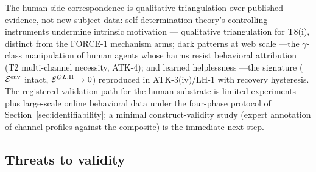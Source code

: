 The human-side correspondence is qualitative triangulation over published
evidence, not new subject data: self-determination theory's controlling
instruments undermine intrinsic motivation \citep{ryan_deci2000}---
qualitative triangulation for T8(i), distinct from the FORCE-1 mechanism
arms; dark patterns at web scale
\citep{nouwens2020}---the $\gamma$-class manipulation of human agents whose
harms resist behavioral attribution (T2 multi-channel necessity, ATK-4); and
learned helplessness \citep{maier_seligman2016}---the signature
($\mathcal{E}^{\mathrm{env}}$ intact, $\mathcal{E}^{OL,\Pi}\to0$) reproduced in ATK-3(iv)/LH-1 with recovery
hysteresis. The registered validation path for the human substrate is limited
experiments plus large-scale online behavioral data under the four-phase
protocol of Section~\ref{sec:identifiability}; a minimal construct-validity
study (expert annotation of channel profiles against the composite) is the
immediate next step.

\subsection{Threats to validity}\label{sec:threats}

